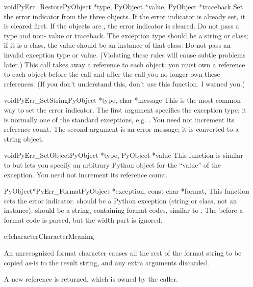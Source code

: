 \begin{cfuncdesc}{void}{PyErr_Restore}{PyObject *type, PyObject *value,
                                       PyObject *traceback}
  Set  the error indicator from the three objects.  If the error
  indicator is already set, it is cleared first.  If the objects are
  \NULL, the error indicator is cleared.  Do not pass a \NULL{} type
  and non-\NULL{} value or traceback.  The exception type should be a
  string or class; if it is a class, the value should be an instance
  of that class.  Do not pass an invalid exception type or value.
  (Violating these rules will cause subtle problems later.)  This call
  takes away a reference to each object: you must own a reference to
  each object before the call and after the call you no longer own
  these references.  (If you don't understand this, don't use this
  function.  I warned you.)  
\end{cfuncdesc}

\begin{cfuncdesc}{void}{PyErr_SetString}{PyObject *type, char *message}
  This is the most common way to set the error indicator.  The first
  argument specifies the exception type; it is normally one of the
  standard exceptions, e.g. .  You need not
  increment its reference count.  The second argument is an error
  message; it is converted to a string object.
\end{cfuncdesc}

\begin{cfuncdesc}{void}{PyErr_SetObject}{PyObject *type, PyObject *value}
  This function is similar to  but lets
  you specify an arbitrary Python object for the ``value'' of the
  exception.  You need not increment its reference count.
\end{cfuncdesc}

\begin{cfuncdesc}{PyObject*}{PyErr_Format}{PyObject *exception,
                                           const char *format, \moreargs}
  This function sets the error indicator.   should be a
  Python exception (string or class, not an instance).  
  should be a string, containing format codes, similar to
  . The  before a format
  code is parsed, but the width part is ignored.

  \begin{tableii}{c|l}{character}{Character}{Meaning}
  \end{tableii}

  An unrecognized format character causes all the rest of the format
  string to be copied as-is to the result string, and any extra
  arguments discarded.

  A new reference is returned, which is owned by the caller.
\end{cfuncdesc}

